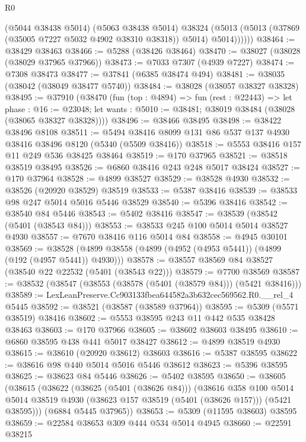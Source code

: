 \begin{lexlean}{R0}
\begin{coremodule}
              (@5044 @38438 @5014)
              (@5063 @38438 @5014)
              @38324
              (@5013 (@5013 (@37869 (@35005 @7227 @5032 @4902 @38310 @38318)) @5014) @5014))))))
@38464 := @38429 @38463
@38466 := @5288 (@38426 @38464)
@38470 := @38027 (@38028 (@38029 @37965 @37966))
@38473 := @7033 @7307 (@4939 @7227)
@38474 := @7308 @38473
@38477 := @37841 (@6385 @38474 @494)
@38481 := @38035 (@38042 (@38049 @38477 @5740))
@38484 := @38028 (@38057 @38327 @38328)
@38495 := @37910
    (@38470
      (fun (top : @4894) =>
      fun (rest : @22443) =>
      let phase : @16 := @23048;
      let wants : @5010 := @38481; @38019 @38484 (@38028 (@38065 @38327 @38328))))
@38496 := @38466 @38495
@38498 := @38422 @38496 @8108
@38511 := @5494 @38416 @8099 @131 @86 @537 @137 @4930 @38416 @38496 @8120 (@5340 (@5509 @38416))
@38518 := @5553 @38416 @157 @11 @249 @536 @38425 @38464
@38519 := @170 @37965
@38521 := @38518 @38519 @38495
@38526 := @6860 @38416 @243 @248 @5017 @38424
@38527 := @170 @37964
@38528 := @4899 @38527
@38529 := @38528 @4930
@38532 := @38526 (@20920 @38529) @38519
@38533 := @5387 @38416
@38539 := @38533 @98 @247 @5014 @5016 @5446 @38529
@38540 := @5396 @38416
@38542 := @38540 @84 @5446
@38543 := @5402 @38416
@38547 := @38539 (@38542 (@5401 (@38543 @84)))
@38553 := @38533 @245 @100 @5014 @5014 @38527 @4930
@38557 := @7670 @38416 @116 @5014 @84
@38558 := @4945 @30101
@38569 := @38528 (@4899 @38558 (@4899 (@4952 (@4953 @5441)) (@4899 (@192 (@4957 @5441)) @4930)))
@38578 := @38557 @38569 @84 @38527 (@38540 @22 @22532 (@5401 (@38543 @22)))
@38579 := @7700 @38569
@38587 := @38532 (@38547 (@38553 (@38578 (@5401 (@38579 @84))) (@5421 @38416)))
@38589 := LexLeanPreserve.Cc903133fbea644582a3b632cec569562.R0.__rel_4 @5445
@38592 := @38521 (@38587 (@38589 @37964))
@38595 := @5309 (@5571 @38519) @38416
@38602 := @5553 @38595 @243 @11 @442 @535 @38428 @38463
@38603 := @170 @37966
@38605 := @38602 @38603 @38495
@38610 := @6860 @38595 @438 @441 @5017 @38427
@38612 := @4899 @38519 @4930
@38615 := @38610 (@20920 @38612) @38603
@38616 := @5387 @38595
@38622 := @38616 @98 @440 @5014 @5016 @5446 @38612
@38623 := @5396 @38595
@38625 := @38623 @84 @5446
@38626 := @5402 @38595
@38650 := @38605
    (@38615
      (@38622
        (@38625 (@5401 (@38626 @84)))
        (@38616
          @358
          @100
          @5014
          @5014
          @38519
          @4930
          (@38623 @157 @38519 (@5401 (@38626 @157)))
          (@5421 @38595)))
      (@6884 @5445 @37965))
@38653 := @5309 (@11595 @38603) @38595
@38659 := @22584 @38653 @309 @444 @534 @5014 @4945
@38660 := @22591 @38215

\end{coremodule}
\end{lexlean}
